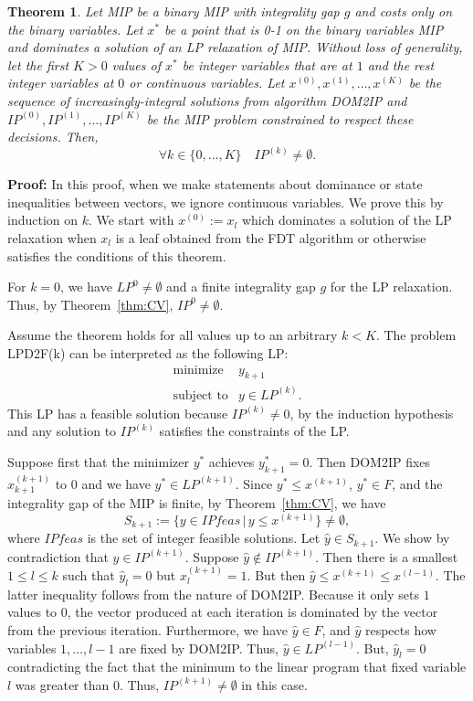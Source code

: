 \documentclass[11pt]{article}
\newtheorem{theorem}{Theorem}
\begin{document}
\begin{theorem}
Let MIP be a binary MIP with integrality gap $g$ and costs only on the
binary variables. Let $x^*$ be a point that is 0-1 on the binary
variables MIP and dominates a solution of an LP relaxation of MIP.
Without loss of generality, let the first $K>0$ values of $x^*$ be
integer variables that are at $1$ and the rest integer variables at
$0$ or continuous variables.  Let $x^{(0)},x^{(1)},\ldots,x^{(K)}$ be
the sequence of increasingly-integral solutions from algorithm DOM2IP
and $IP^{(0)},IP^{(1)},\ldots, IP^{(K)}$ be the MIP problem constrained
to respect these decisions.  Then,
$$\forall k\in \{0,\ldots,K\}\quad IP^{(k)}\neq \emptyset.$$
\end{theorem}
{\bf Proof: } In this proof, when we make statements about dominance
or state inequalities between vectors, we ignore continuous variables.
We prove this by induction on $k$.  We start with $x^{(0)}:=x_l$ which
dominates a solution of the LP relaxation when $x_l$ is a leaf
obtained from the FDT algorithm or otherwise satisfies the conditions
of this theorem.

For $k=0$, we have $LP^{0}\neq \emptyset$ and a finite integrality gap
$g$ for the LP relaxation.  Thus, by Theorem~\ref{thm:CV}, $IP^{0}\neq
\emptyset$.

Assume the theorem holds for all values up to an arbitrary $k<K$.
The problem LPD2F(k) can be interpreted as the following LP:
\begin{displaymath}
\begin{array}{llllll}
\mbox{minimize}& y_{k+1} \\
\mbox{subject to}& y\in LP^{(k)}.
\end{array}
\end{displaymath}
This LP has a feasible solution because $IP^{(k)} \neq 0$, by the induction
hypothesis and any solution to $IP^{(k)}$ satisfies the constraints of the LP.

Suppose first that the minimizer $y^*$ achieves $y^*_{k+1}=0$.  Then 
DOM2IP fixes $x^{(k+1)}_{k+1}$ to $0$ and we have $y^*\in LP^{(k+1)}$.  
Since $y^*\leq x^{(k+1)}$, $y^*\in F$, and the integrality gap of the MIP is finite, 
by Theorem~\ref{thm:CV},  we have
$$S_{k+1}:=\{y\in IPfeas\, |\, y\leq x^{(k+1)}\}\neq \emptyset,$$ 
where $IPfeas$ is the set of integer feasible solutions.  
Let $\hat{y}\in S_{k+1}$.  We show by contradiction that $\hat{y}\in 
IP^{(k+1)}$.  Suppose  $\hat{y}\not \in IP^{(k+1)}$.  Then there is a 
smallest $1\leq l\leq k$ such that $\hat{y}_l=0$ but $x^{(k+1)}_l=1$.  
But then $\hat{y}\leq x^{(k+1)}\leq x^{(l-1)}$.  The latter inequality
follows from the nature of DOM2IP.  Because it only sets $1$ values to $0$,
the vector produced at each iteration is dominated by the vector from the
previous iteration.  Furthermore, we have $\hat{y}\in F$, and 
$\hat{y}$ respects how variables $1,\ldots,l-1$ are fixed by DOM2IP.  
Thus, $\hat{y}\in LP^{(l-1)}$.  But, $\hat{y}_l=0$ contradicting the 
fact that the minimum to the linear program that fixed variable $l$ was 
greater than $0$.  Thus, $IP^{(k+1)}\neq \emptyset$ in this case.  
\end{document}
